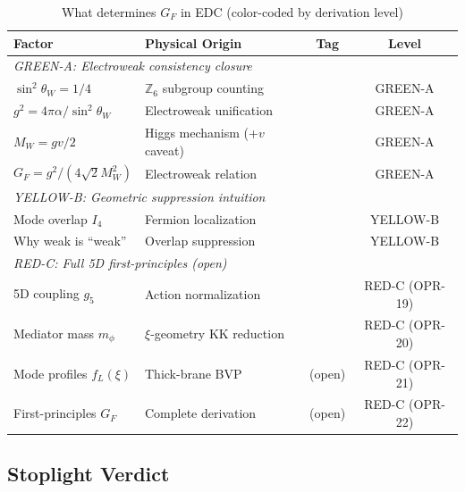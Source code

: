 \begin{table}[ht]
\centering
\caption{What determines $G_F$ in EDC (color-coded by derivation level)}
\label{tab:ch11_summary}
\begin{tabular}{p{3.5cm}p{4.5cm}cc}
\toprule
\textbf{Factor} & \textbf{Physical Origin} & \textbf{Tag} & \textbf{Level} \\
\midrule
\multicolumn{4}{l}{\textit{GREEN-A: Electroweak consistency closure}} \\
$\sin^2\theta_W = 1/4$ & $\mathbb{Z}_6$ subgroup counting & \tagDer{} & GREEN-A \\
$g^2 = 4\pi\alpha/\sin^2\theta_W$ & Electroweak unification & \tagDc{} & GREEN-A \\
$M_W = gv/2$ & Higgs mechanism (+$v$ caveat) & \tagDc{} & GREEN-A \\
$G_F = g^2/(4\sqrt{2}M_W^2)$ & Electroweak relation & \tagDc{} & GREEN-A \\
\midrule
\multicolumn{4}{l}{\textit{YELLOW-B: Geometric suppression intuition}} \\
Mode overlap $I_4$ & Fermion localization & \tagP{} & YELLOW-B \\
Why weak is ``weak'' & Overlap suppression & \tagI{} & YELLOW-B \\
\midrule
\multicolumn{4}{l}{\textit{RED-C: Full 5D first-principles (open)}} \\
5D coupling $g_5$ & Action normalization & \tagP{} & RED-C (OPR-19) \\
Mediator mass $m_\phi$ & $\xi$-geometry KK reduction & \tagP{} & RED-C (OPR-20) \\
Mode profiles $f_L(\xi)$ & Thick-brane BVP & (open) & RED-C (OPR-21) \\
First-principles $G_F$ & Complete derivation & (open) & RED-C (OPR-22) \\
\bottomrule
\end{tabular}
\end{table}

\subsection{Stoplight Verdict}
\label{sec:ch11_verdict}

